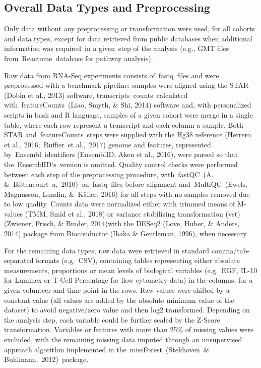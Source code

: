 \documentclass[
]{book}
\begin{document}
\hypertarget{overall-data-types-and-preprocessing}{%
\subsection{Overall Data Types and Preprocessing}\label{overall-data-types-and-preprocessing}}

Only data without any preprocessing or transformation were used, for all cohorts and data types, except for data retrieved from public databases when additional information was required~in a given~step of the analysis (e.g., GMT files from~Reactome~database for pathway analysis).

Raw data from RNA-Seq experiments consists of~fastq~files and were preprocessed with a benchmark pipeline: samples were aligned using the STAR (Dobin et al., 2013)⁠ software, transcripts~counts~calculated with~featureCounts~(Liao, Smyth, \& Shi, 2014)⁠ software and, with personalized scripts in bash and R language, samples of a given cohort were merge in a single table, where each row represent a transcript and each column a sample. Both STAR and~featureCounts~steps were supplied with the Hg38 reference (Herrero et al., 2016;~Ruffier~et al.,~2017)⁠⁠ genome and features, represented by~Ensembl~identifiers (EnsemblID, Aken et al., 2016), were parsed so that the~EnsemblID`s~version is omitted. Quality control checks were performed between each step of the preprocessing procedure, with~fastQC~(A. \&~Bittencourt~a,~2010)⁠~on~fastq~files before alignment and~MultiQC~(Ewels, Magnusson, Lundin, \&~Käller, 2016)⁠ for all steps with no samples removed due to low quality. Counts data were normalized either with trimmed means of M-values (TMM, Smid et al., 2018)⁠ or variance stabilizing transformation (vst) (Zwiener, Frisch, \& Binder, 2014)⁠with the DESeq2 (Love, Huber, \& Anders, 2014)⁠ package from Bioconductor (Ihaka \& Gentleman, 1996)⁠⁠, when necessary.

For the remaining data types, raw data were retrieved in standard comma/tab-separated formats (e.g.~CSV), containing tables representing either absolute measurements, proportions or mean levels of biological variables (e.g.~EGF, IL-10 for Luminex or T-Cell Percentage for flow cytometry data) in the columns, for a given volunteer and time-point in the rows. Raw values were shifted by a constant value (all values are added by the absolute minimum value of the dataset) to avoid negative/zero value and then log2 transformed. Depending on the analysis step, each variable could be further scaled by the Z-Score transformation. Variables or features with more than 25\% of missing values were excluded, with the remaining missing data imputed through an unsupervised approach algorithm implemented in the~missForest~(Stekhoven~\& Buhlmann,~2012)⁠~package.
\end{document}
